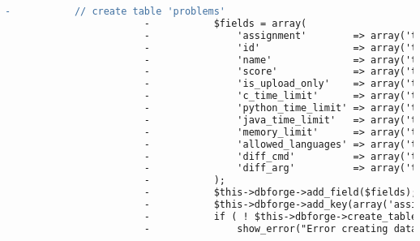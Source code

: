 \begin{lstlisting}[language=diff, caption=Perubahan pada kode Install.php]
						-			// create table 'problems'
						-			$fields = array(
						-				'assignment'        => array('type' => 'SMALLINT', 'constraint' => 4, 'unsigned' => TRUE),
						-				'id'                => array('type' => 'SMALLINT', 'constraint' => 4, 'unsigned' => TRUE),
						-				'name'              => array('type' => 'VARCHAR', 'constraint' => 50, 'default' => ''),
						-				'score'             => array('type' => 'INT', 'constraint' => 11),
						-				'is_upload_only'    => array('type' => 'TINYINT', 'constraint' => 1, 'default' => '0'),
						-				'c_time_limit'      => array('type' => 'INT', 'constraint' => 11, 'unsigned' => TRUE, 'default' => 500),
						-				'python_time_limit' => array('type' => 'INT', 'constraint' => 11, 'unsigned' => TRUE, 'default' => 1500),
						-				'java_time_limit'   => array('type' => 'INT', 'constraint' => 11, 'unsigned' => TRUE, 'default' => 2000),
						-				'memory_limit'      => array('type' => 'INT', 'constraint' => 11, 'unsigned' => TRUE, 'default' => 50000),
						-				'allowed_languages' => array('type' => 'TEXT'),
						-				'diff_cmd'          => array('type' => 'VARCHAR', 'constraint' => 20, 'default' => 'diff'),
						-				'diff_arg'          => array('type' => 'VARCHAR', 'constraint' => 20, 'default' => '-bB'),
						-			);
						-			$this->dbforge->add_field($fields);
						-			$this->dbforge->add_key(array('assignment', 'id'));
						-			if ( ! $this->dbforge->create_table('problems', TRUE))
						-				show_error("Error creating database table ".$this->db->dbprefix('problems'));
						

\end{lstlisting}
